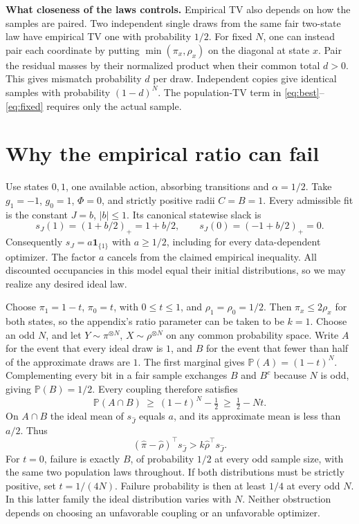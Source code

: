 \documentclass[12pt,a4paper]{article}
\newcommand{\Prob}{\mathbb P}
\newcommand{\al}{\alpha}
\newcommand{\lead}[1]{\par\smallskip\noindent\textbf{#1}\enspace}
\begin{document}
\lead{What closeness of the laws controls.}
Empirical TV also depends on how the samples are paired. Two independent
single draws from the same fair two-state law have empirical TV one with
probability $1/2$. For fixed $N$, one can instead pair each coordinate by
putting $\min(\pi_x,\rho_x)$ on the diagonal at state $x$. Pair the
residual masses by their normalized product when their common total
$d>0$. This gives mismatch probability $d$ per draw. Independent copies
give identical samples with probability $(1-d)^N$. The population-TV term
in \eqref{eq:best}--\eqref{eq:fixed} requires only the actual sample.

\newpage
\section*{Why the empirical ratio can fail}
Use states $0,1$, one available action, absorbing transitions and
$\al=1/2$. Take $g_1=-1$, $g_0=1$, $\Phi=0$, and strictly positive radii
$C=B=1$. Every admissible fit is the constant $J=b$, $|b|\le1$.
Its canonical statewise slack is
\[
 s_J(1)=(1+b/2)_+=1+b/2,\qquad
 s_J(0)=(-1+b/2)_+=0 .
\]
Consequently $s_J=a\mathbf 1_{\{1\}}$ with $a\ge1/2$, including for
every data-dependent optimizer. The factor $a$ cancels from the claimed
empirical inequality. All discounted occupancies in this model equal their
initial distributions, so we may realize any desired ideal law.

Choose $\pi_1=1-t$, $\pi_0=t$, with $0\le t\le1$, and $\rho_1=\rho_0=1/2$.
Then $\pi_x\le 2\rho_x$ for both states, so the appendix's ratio
parameter can be taken to be $k=1$. Choose an odd $N$, and let
$Y\sim\pi^{\otimes N}$, $X\sim\rho^{\otimes N}$ on any common
probability space. Write $A$ for the event that every ideal draw is $1$,
and $B$ for the event that fewer than half of the approximate draws are
$1$. The first marginal gives $\Prob(A)=(1-t)^N$. Complementing every
bit in a fair sample exchanges $B$ and $B^c$ because $N$ is odd, giving
$\Prob(B)=1/2$. Every coupling therefore satisfies
\[
 \Prob(A\cap B)\ \ge\ (1-t)^N-\tfrac12
 \ \ge\ \tfrac12-Nt .
\]
On $A\cap B$ the ideal mean of $s_{\widehat J}$ equals $a$, and its
approximate mean is less than $a/2$. Thus
\[
 (\widehat\pi-\widehat\rho)^\top s_{\widehat J}
       > k\widehat\rho^\top s_{\widehat J}.
\]
For $t=0$, failure is exactly $B$, of probability $1/2$ at every odd
sample size, with the same two population laws throughout. If both
distributions must be strictly positive, set $t=1/(4N)$. Failure
probability is then at least $1/4$ at every odd $N$. In this latter
family the ideal distribution varies with $N$. Neither obstruction
depends on choosing an unfavorable coupling or an unfavorable optimizer.
\end{document}
